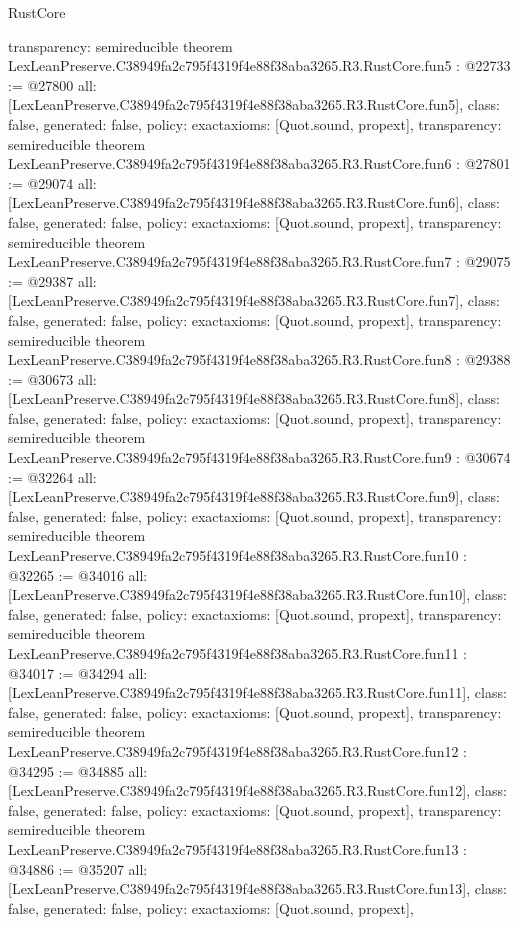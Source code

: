 \begin{lexlean}{RustCore}
\begin{coremodule}
{  transparency: semireducible
}
theorem LexLeanPreserve.C38949fa2c795f4319f4e88f38aba3265.R3.RustCore.fun5 : @22733 := @27800 {
  all: [LexLeanPreserve.C38949fa2c795f4319f4e88f38aba3265.R3.RustCore.fun5],
  class: false,
  generated: false,
  policy: exact{axioms: [Quot.sound, propext]},
  transparency: semireducible
}
theorem LexLeanPreserve.C38949fa2c795f4319f4e88f38aba3265.R3.RustCore.fun6 : @27801 := @29074 {
  all: [LexLeanPreserve.C38949fa2c795f4319f4e88f38aba3265.R3.RustCore.fun6],
  class: false,
  generated: false,
  policy: exact{axioms: [Quot.sound, propext]},
  transparency: semireducible
}
theorem LexLeanPreserve.C38949fa2c795f4319f4e88f38aba3265.R3.RustCore.fun7 : @29075 := @29387 {
  all: [LexLeanPreserve.C38949fa2c795f4319f4e88f38aba3265.R3.RustCore.fun7],
  class: false,
  generated: false,
  policy: exact{axioms: [Quot.sound, propext]},
  transparency: semireducible
}
theorem LexLeanPreserve.C38949fa2c795f4319f4e88f38aba3265.R3.RustCore.fun8 : @29388 := @30673 {
  all: [LexLeanPreserve.C38949fa2c795f4319f4e88f38aba3265.R3.RustCore.fun8],
  class: false,
  generated: false,
  policy: exact{axioms: [Quot.sound, propext]},
  transparency: semireducible
}
theorem LexLeanPreserve.C38949fa2c795f4319f4e88f38aba3265.R3.RustCore.fun9 : @30674 := @32264 {
  all: [LexLeanPreserve.C38949fa2c795f4319f4e88f38aba3265.R3.RustCore.fun9],
  class: false,
  generated: false,
  policy: exact{axioms: [Quot.sound, propext]},
  transparency: semireducible
}
theorem LexLeanPreserve.C38949fa2c795f4319f4e88f38aba3265.R3.RustCore.fun10 : @32265 := @34016 {
  all: [LexLeanPreserve.C38949fa2c795f4319f4e88f38aba3265.R3.RustCore.fun10],
  class: false,
  generated: false,
  policy: exact{axioms: [Quot.sound, propext]},
  transparency: semireducible
}
theorem LexLeanPreserve.C38949fa2c795f4319f4e88f38aba3265.R3.RustCore.fun11 : @34017 := @34294 {
  all: [LexLeanPreserve.C38949fa2c795f4319f4e88f38aba3265.R3.RustCore.fun11],
  class: false,
  generated: false,
  policy: exact{axioms: [Quot.sound, propext]},
  transparency: semireducible
}
theorem LexLeanPreserve.C38949fa2c795f4319f4e88f38aba3265.R3.RustCore.fun12 : @34295 := @34885 {
  all: [LexLeanPreserve.C38949fa2c795f4319f4e88f38aba3265.R3.RustCore.fun12],
  class: false,
  generated: false,
  policy: exact{axioms: [Quot.sound, propext]},
  transparency: semireducible
}
theorem LexLeanPreserve.C38949fa2c795f4319f4e88f38aba3265.R3.RustCore.fun13 : @34886 := @35207 {
  all: [LexLeanPreserve.C38949fa2c795f4319f4e88f38aba3265.R3.RustCore.fun13],
  class: false,
  generated: false,
  policy: exact{axioms: [Quot.sound, propext]},
}
\end{coremodule}
\end{lexlean}
